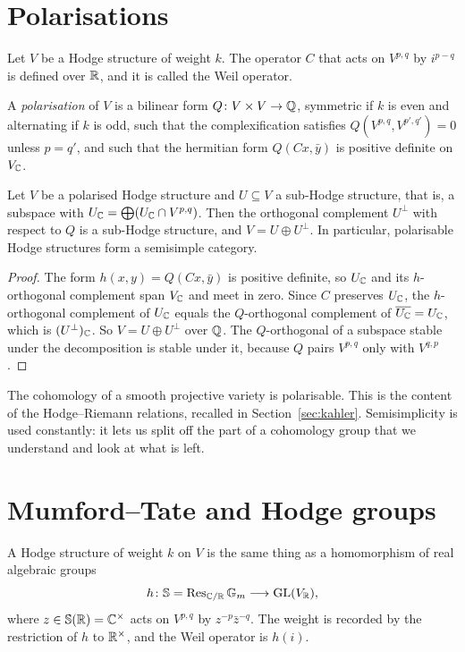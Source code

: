 \section{Polarisations}

Let $V$ be a Hodge structure of weight $k$. The operator $C$ that acts on
$V^{p,q}$ by $i^{p-q}$ is defined over $\mathbb{R}$, and it is called the Weil
operator.

\begin{definition}
A \emph{polarisation} of $V$ is a bilinear form $Q\colon V\times V\to\mathbb{Q}$,
symmetric if $k$ is even and alternating if $k$ is odd, such that the
complexification satisfies $Q(V^{p,q},V^{p',q'})=0$ unless $p=q'$, and such
that the hermitian form $Q(Cx,\bar y)$ is positive definite on $V_{\mathbb{C}}$.
\end{definition}

\begin{proposition}\label{prop:semisimple}
Let $V$ be a polarised Hodge structure and $U\subseteq V$ a sub-Hodge
structure, that is, a subspace with $U_{\mathbb{C}}=\bigoplus(U_{\mathbb{C}}\cap V^{p,q})$.
Then the orthogonal complement $U^{\perp}$ with respect to $Q$ is a sub-Hodge
structure, and $V=U\oplus U^{\perp}$. In particular, polarisable Hodge
structures form a semisimple category.
\end{proposition}

\begin{proof}
The form $h(x,y)=Q(Cx,\bar y)$ is positive definite, so $U_{\mathbb{C}}$ and its
$h$-orthogonal complement span $V_{\mathbb{C}}$ and meet in zero. Since $C$
preserves $U_{\mathbb{C}}$, the $h$-orthogonal complement of $U_{\mathbb{C}}$ equals the
$Q$-orthogonal complement of $\overline{U_{\mathbb{C}}}=U_{\mathbb{C}}$, which is
$(U^{\perp})_{\mathbb{C}}$. So $V=U\oplus U^{\perp}$ over $\mathbb{Q}$. The $Q$-orthogonal
of a subspace stable under the decomposition is stable under it, because
$Q$ pairs $V^{p,q}$ only with $V^{q,p}$.
\end{proof}

The cohomology of a smooth projective variety is polarisable. This is the
content of the Hodge--Riemann relations, recalled in
Section~\ref{sec:kahler}. Semisimplicity is used constantly: it lets us
split off the part of a cohomology group that we understand and look at
what is left.

\section{Mumford--Tate and Hodge groups}\label{sec:mt}

A Hodge structure of weight $k$ on $V$ is the same thing as a homomorphism
of real algebraic groups
\[
  h\colon\mathbb S=\operatorname{Res}_{\mathbb{C}/\mathbb{R}}\mathbb G_{m}\longrightarrow
  \operatorname{GL}(V_{\mathbb{R}}),
\]
where $z\in\mathbb S(\mathbb{R})=\mathbb{C}^{\times}$ acts on $V^{p,q}$ by
$z^{-p}\bar z^{-q}$. The weight is recorded by the restriction of $h$ to
$\mathbb{R}^{\times}$, and the Weil operator is $h(i)$.

